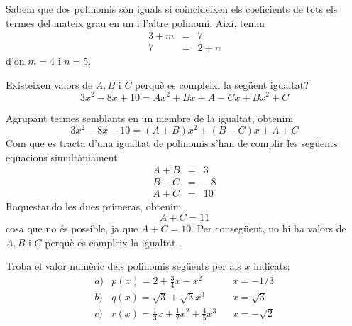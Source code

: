 \begin{solucio}
Sabem que dos polinomis són iguals si coincideixen els coeficients de
tots els termes del mateix grau en un i l'altre polinomi. Així,
tenim\begin{eqnarray*}
3+m &=&7 \\
7 &=&2+n
\end{eqnarray*}d'on $m=4$ i $n=5$.
\end{solucio}

\begin{exercici}
 Existeixen valors de $A,B$ i $C$ perquè es compleixi la
següent igualtat?\[
3x^{2}-8x+10=Ax^{2}+Bx+A-Cx+Bx^{2}+C
\]
\end{exercici}

\begin{solucio}
Agrupant termes semblants en un membre de la igualtat, obtenim\[
3x^{2}-8x+10=(A+B)x^{2}+(B-C)x+A+C
\]Com que es tracta d’una igualtat de polinomis s'han de complir les següents
equacions simultàniament\begin{eqnarray*}
A+B &=&3 \\
B-C &=&-8 \\
A+C &=&10
\end{eqnarray*}Raquestando les dues primeras, obtenim\[
A+C=11
\]cosa que no és possible, ja que $A+C=10$. Per consegüent, no hi ha valors de $A,B$ i $C$ perquè es compleix la igualtat.
\end{solucio}

\begin{exercici}
Troba el valor numèric dels polinomis següents per als $x$
indicats:\[
\begin{array}{llll}
a) & p(x)=2+\frac{3}{4}x-x^{2} & & x=-1/3 \\
b) & q(x)=\sqrt{3}+\sqrt{3}x^{3} & & x=\sqrt{3} \\
c) & r(x)=\frac{1}{3}x+\frac{1}{2}x^{2}+\frac{4}{5}x^{3} & & x=-\sqrt{2}\end{array}\]
\end{exercici}

